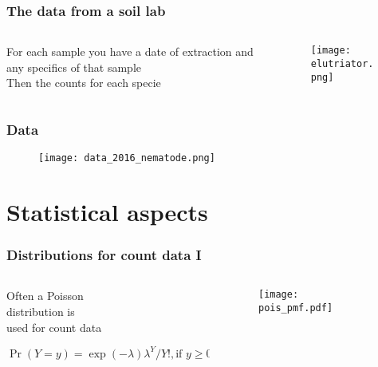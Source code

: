 \documentclass{beamer} %
\theoremstyle{definition} %
\begin{document}
\begin{frame}
\frametitle{The data from a soil lab}
\begin{columns} %
\begin{column}{0.5\textwidth}
For each sample you have a date of extraction
\vspace{0.25in}
\pause 
and any specifics of that sample\\
\pause
\vspace{0.25in}
Then the counts for each specie
\vspace{0.25in}  
\pause
\end{column}
\begin{column}{0.5\textwidth} %
\begin{figure}[htb]
\hspace{-0.4in}\texttt{[image: elutriator.png]}
\end{figure}
\end{column}
\end{columns}
\end{frame}

\begin{frame}
\frametitle{Data}
\begin{figure}[htb]
\texttt{[image: data\_2016\_nematode.png]}
\end{figure}
\end{frame}


\section{Statistical aspects} 
\begin{frame}
\frametitle{Distributions for count data I}
\begin{columns} %
\begin{column}{0.5\textwidth}
Often a Poisson \\
distribution is \\
used for count data

$ \Pr(Y=y)=
\exp(-\lambda)\lambda^Y/Y!, \text{if }y\geq0 
$

\end{column}
\begin{column}{0.5\textwidth} %
\begin{figure}[htb]
\hspace{-.45in}\texttt{[image: pois\_pmf.pdf]}
\end{figure}
\end{column}
\end{columns}
\end{frame}
\end{document}
